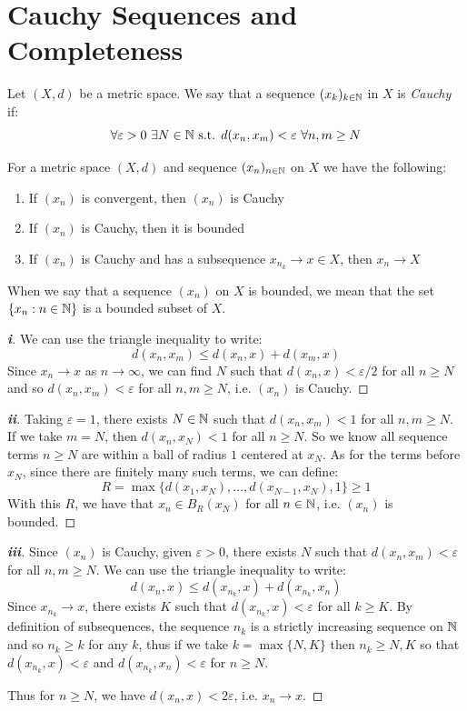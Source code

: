 \documentclass[../main.tex]{subfiles}
\begin{document}
\section{Cauchy Sequences and Completeness}
\begin{definition}
  Let $(X, d)$ be a metric space.
  We say that a sequence $(x_k)_{k \in \mathbb{N}}$ in $X$ is \textit{Cauchy} if:
  \[
    \forall \varepsilon > 0\ \exists N \in \N \text{ s.t. } d(x_n, x_m) < \varepsilon\ \forall n, m \geq N
  \]
\end{definition}
\begin{proposition}
  For a metric space $(X, d)$ and sequence $(x_n)_{n \in \mathbb{N}}$ on $X$ we have the following: \label{convCauchy}
  \begin{enumerate}
    \item If $(x_n)$ is convergent, then $(x_n)$ is Cauchy
    \item If $(x_n)$ is Cauchy, then it is bounded
    \item If $(x_n)$ is Cauchy and has a subsequence $x_{n_k} \to x \in X$, then $x_n \to X$
  \end{enumerate}
\end{proposition}
\begin{remark}
  When we say that a sequence $(x_n)$ on $X$ is bounded, we mean that the set $\{x_n: n \in \mathbb{N}\}$ is a bounded subset of $X$.
\end{remark}
\begin{proof}[\textbf{i}]
  We can use the triangle inequality to write:
  \[
    d(x_n, x_m) \leq d(x_n, x) + d(x_m, x)
  \]
  Since $x_n \to x$ as $n \to \infty$, we can find $N$ such that $d(x_n, x) < \varepsilon/2$ for all $n \geq N$ and so $d(x_n, x_m) < \varepsilon$ for all $n, m \geq N$, i.e. $(x_n)$ is Cauchy.
\end{proof}
\begin{proof}[\textbf{ii}]
  Taking $\varepsilon = 1$, there exists $N \in \mathbb{N}$ such that $d(x_n, x_m) < 1$ for all $n, m \geq N$.
  If we take $m = N$, then $d(x_n, x_N) < 1$ for all $n \geq N$.
  So we know all sequence terms $n \geq N$ are within a ball of radius $1$ centered at $x_N$.
  As for the terms before $x_N$, since there are finitely many such terms, we can define:
  \[
    R = \max\{d(x_1, x_N), \ldots, d(x_{N - 1}, x_N), 1\} \geq 1
  \]
  With this $R$, we have that $x_n \in B_{R}(x_N)$ for all $n \in \mathbb{N}$, i.e. $(x_n)$ is bounded.
\end{proof}
\begin{proof}[\textbf{iii}]
  Since $(x_n)$ is Cauchy, given $\varepsilon > 0$, there exists $N$ such that $d(x_n, x_m) < \varepsilon$ for all $n, m \geq N$.
  We can use the triangle inequality to write:
  \[
    d(x_n, x) \leq d(x_{n_k}, x) + d(x_{n_k}, x_n)
  \]
  Since $x_{n_k} \to x$, there exists $K$ such that $d(x_{n_k}, x) < \varepsilon$ for all $k \geq K$.
  By definition of subsequences, the sequence $n_k$ is a strictly increasing sequence on $\mathbb{N}$ and so $n_k \geq k$ for any $k$, thus if we take $k = \max\{N, K\}$ then $n_k \geq N, K$ so that $d(x_{n_k}, x) < \varepsilon$ and $d(x_{n_k}, x_n) < \varepsilon$ for $n \geq N$.

  Thus for $n \geq N$, we have $d(x_n, x) < 2\varepsilon$, i.e. $x_{n} \to x$.
\end{proof}
\end{document}
